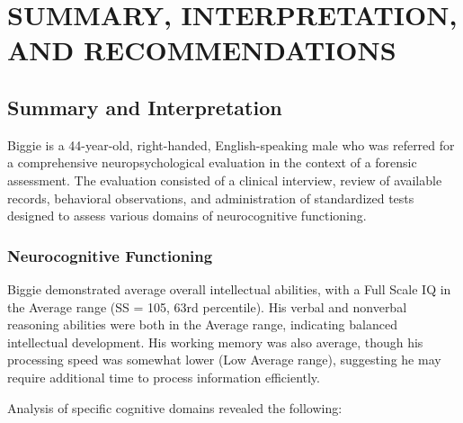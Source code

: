 \documentclass[
  letterpaper,
  DIV=11,
  numbers=noendperiod]{scrartcl}
\begin{document}
\section{SUMMARY, INTERPRETATION, AND
RECOMMENDATIONS}\label{summary-interpretation-and-recommendations}

\subsection{Summary and
Interpretation}\label{summary-and-interpretation}

Biggie is a 44-year-old, right-handed, English-speaking male who was
referred for a comprehensive neuropsychological evaluation in the
context of a forensic assessment. The evaluation consisted of a clinical
interview, review of available records, behavioral observations, and
administration of standardized tests designed to assess various domains
of neurocognitive functioning.

\subsubsection{Neurocognitive
Functioning}\label{neurocognitive-functioning}

Biggie demonstrated average overall intellectual abilities, with a Full
Scale IQ in the Average range (SS = 105, 63rd percentile). His verbal
and nonverbal reasoning abilities were both in the Average range,
indicating balanced intellectual development. His working memory was
also average, though his processing speed was somewhat lower (Low
Average range), suggesting he may require additional time to process
information efficiently.

Analysis of specific cognitive domains revealed the following:
\end{document}
